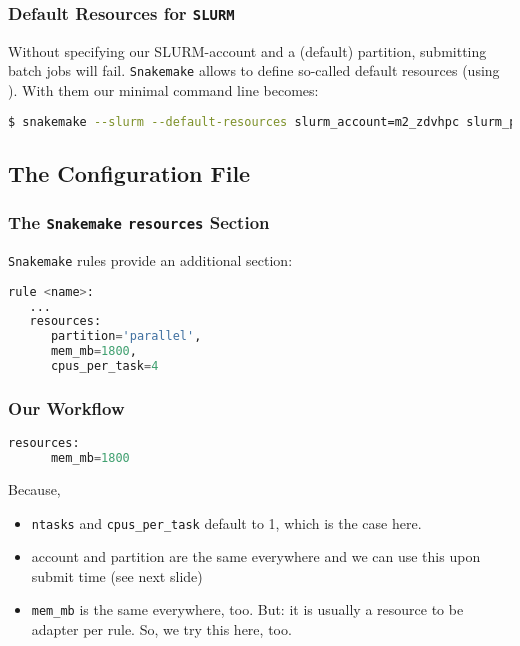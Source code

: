 \begin{frame}[fragile]
  \frametitle{Default Resources for \texttt{SLURM}}
  Without specifying our SLURM-account and a (default) partition, submitting batch jobs will fail. \texttt{Snakemake} allows to define so-called default resources (using ). With them our minimal command line becomes:
  \begin{lstlisting}[language=Bash, style=Shell]
$ snakemake --slurm --default-resources slurm_account=m2_zdvhpc slurm_partition=smp
  \end{lstlisting}
\end{frame}



\subsection{The Configuration File}

\begin{frame}[fragile]
  \frametitle{The \texttt{Snakemake} \texttt{resources} Section}
  \texttt{Snakemake} rules provide an additional section:
  \begin{lstlisting}[language=Python,style=Python]
rule <name>:
   ...
   resources:
      partition='parallel',
      mem_mb=1800,
      cpus_per_task=4
  \end{lstlisting}
\end{frame}

\begin{frame}[fragile]
  \frametitle{Our Workflow}
  \begin{lstlisting}[language=Python,style=Python]
   resources:
      mem_mb=1800
  \end{lstlisting}
  \pause
  Because,
  \begin{itemize}
   \item \texttt{ntasks} and \texttt{cpus\_per\_task} default to 1, which is the case here.
   \item account and partition are the same everywhere and we can use this upon submit time (see next slide)
   \item \texttt{mem\_mb} is the same everywhere, too. But: it is usually a resource to be adapter per rule. So, we try this here, too.
  \end{itemize}
\end{frame}

